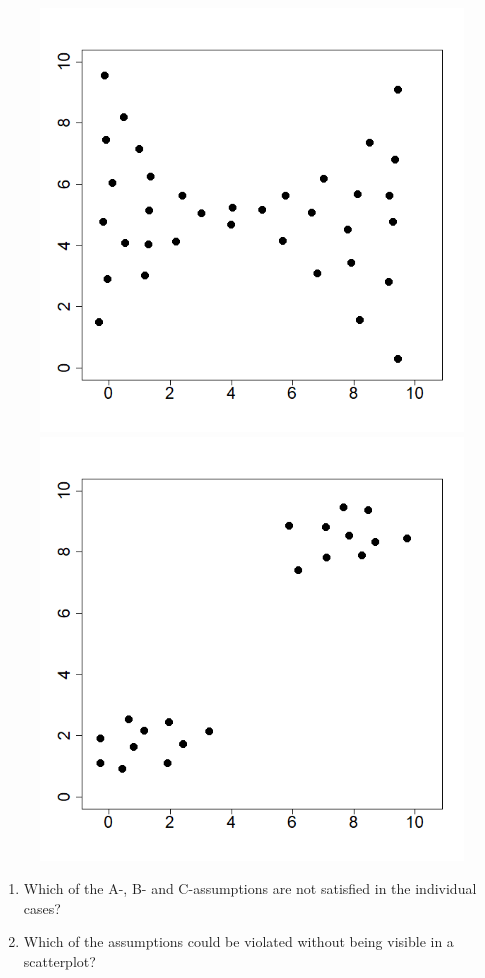 \documentclass[captions=tableheading, 12pt, headings=small, parskip=half]{scrartcl}
\begin{document}
\begin{figure}[H]
\begin{minipage}{0.32 \columnwidth}
	\end{minipage}
	\hfill
	\begin{minipage}{0.32 \columnwidth}
		\includegraphics[width = \columnwidth]{Code1/plot3.png}
		\includegraphics[width = \columnwidth]{Code1/plot6.png}
	\end{minipage}
\end{figure}
\begin{enumerate}[label = \alph*)]
	\item Which of the A-, B- and C-assumptions are not satisfied in the individual cases?
	\item Which of the assumptions could be violated without being visible in a scatterplot?
\end{enumerate}
\end{document}
